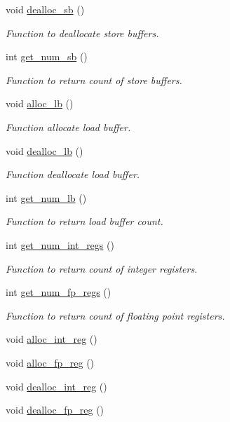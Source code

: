 \begin{DoxyCompactItemize}
void \hyperlink{classrob__c_a9e19d3889e238d066975ae5e132e7095}{dealloc\_\-sb} ()
\begin{DoxyCompactList}\small\item\em Function to deallocate store buffers. \item\end{DoxyCompactList}\item 
int \hyperlink{classrob__c_a702620e2e0eab026934c93be7cd2866b}{get\_\-num\_\-sb} ()
\begin{DoxyCompactList}\small\item\em Function to return count of store buffers. \item\end{DoxyCompactList}\item 
void \hyperlink{classrob__c_a5476feb6ef4144dc29b5587bd81837f6}{alloc\_\-lb} ()
\begin{DoxyCompactList}\small\item\em Function allocate load buffer. \item\end{DoxyCompactList}\item 
void \hyperlink{classrob__c_a7ec1350c0aac21be18c01f58e6853b08}{dealloc\_\-lb} ()
\begin{DoxyCompactList}\small\item\em Function deallocate load buffer. \item\end{DoxyCompactList}\item 
int \hyperlink{classrob__c_a9326e6abb6453e1d59281998521904e7}{get\_\-num\_\-lb} ()
\begin{DoxyCompactList}\small\item\em Function to return load buffer count. \item\end{DoxyCompactList}\item 
int \hyperlink{classrob__c_aefac652816d0579d6b58d5599bb2d9c4}{get\_\-num\_\-int\_\-regs} ()
\begin{DoxyCompactList}\small\item\em Function to return count of integer registers. \item\end{DoxyCompactList}\item 
int \hyperlink{classrob__c_a707968aef75347917fc33c2bec6a9886}{get\_\-num\_\-fp\_\-regs} ()
\begin{DoxyCompactList}\small\item\em Function to return count of floating point registers. \item\end{DoxyCompactList}\item 
void \hyperlink{classrob__c_abb0011ac607de4c93e2f775e7a2419db}{alloc\_\-int\_\-reg} ()
\item 
void \hyperlink{classrob__c_aaf4a632b7a8ad3d1a0cf084d6dc482f4}{alloc\_\-fp\_\-reg} ()
\item 
void \hyperlink{classrob__c_af6e5906b601a1b384c6dd268a2d9be2d}{dealloc\_\-int\_\-reg} ()
\item 
void \hyperlink{classrob__c_ac65c7fbbea7a35244f75b54303bd4c5d}{dealloc\_\-fp\_\-reg} ()
\end{DoxyCompactItemize}
